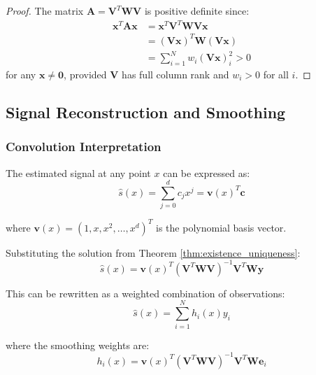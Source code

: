 \documentclass[12pt]{article}
\renewcommand{\vec}[1]{\mathbf{#1}}
\begin{document}
\begin{proof}
    The matrix $\mathbf{A} = \mathbf{V}^T \mathbf{W} \mathbf{V}$ is positive definite since:
    \begin{align}
        \vec{x}^T \mathbf{A} \vec{x} & = \vec{x}^T \mathbf{V}^T \mathbf{W} \mathbf{V} \vec{x} \\
                                     & = (\mathbf{V}\vec{x})^T \mathbf{W} (\mathbf{V}\vec{x}) \\
                                     & = \sum_{i=1}^N w_i (\mathbf{V}\vec{x})_i^2 > 0
    \end{align}
    for any $\vec{x} \neq \vec{0}$, provided $\mathbf{V}$ has full column rank and $w_i > 0$ for all $i$.
\end{proof}

\subsection{Signal Reconstruction and Smoothing}

\subsubsection{Convolution Interpretation}

The estimated signal at any point $x$ can be expressed as:
\begin{equation}
    \hat{s}(x) = \sum_{j=0}^d c_j x^j = \vec{v}(x)^T \vec{c}
\end{equation}

where $\vec{v}(x) = (1, x, x^2, \ldots, x^d)^T$ is the polynomial basis vector.

Substituting the solution from Theorem \ref{thm:existence_uniqueness}:
\begin{equation}
    \hat{s}(x) = \vec{v}(x)^T (\mathbf{V}^T \mathbf{W} \mathbf{V})^{-1} \mathbf{V}^T \mathbf{W} \vec{y}
\end{equation}

This can be rewritten as a weighted combination of observations:
\begin{equation}
    \hat{s}(x) = \sum_{i=1}^N h_i(x) y_i
\end{equation}

where the smoothing weights are:
\begin{equation}
    h_i(x) = \vec{v}(x)^T (\mathbf{V}^T \mathbf{W} \mathbf{V})^{-1} \mathbf{V}^T \mathbf{W} \vec{e}_i
\end{equation}

\end{document}
